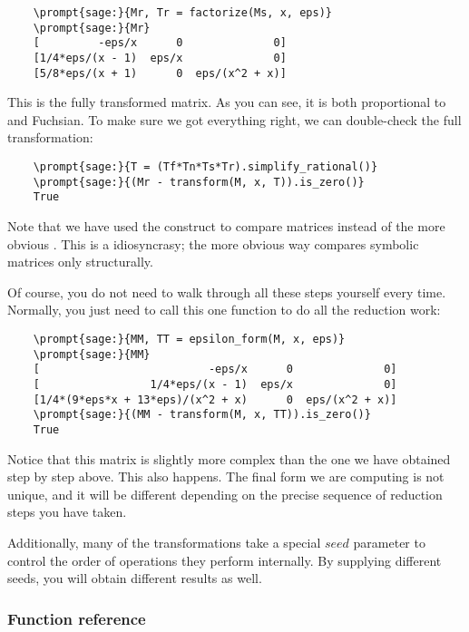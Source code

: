 \documentclass[12pt,a4paper]{article}
\begin{document}
\begin{Verbatim}
    \prompt{sage:}{Mr, Tr = factorize(Ms, x, eps)}
    \prompt{sage:}{Mr}
    [         -eps/x      0              0]
    [1/4*eps/(x - 1)  eps/x              0]
    [5/8*eps/(x + 1)      0  eps/(x^2 + x)]
\end{Verbatim}

This is the fully transformed matrix.
As you can see, it is both proportional to  and Fuchsian.
To make sure we got everything right, we can double-check the full transformation:

\begin{Verbatim}
    \prompt{sage:}{T = (Tf*Tn*Ts*Tr).simplify_rational()}
    \prompt{sage:}{(Mr - transform(M, x, T)).is_zero()}
    True
\end{Verbatim}

Note that we have used the construct  to compare matrices instead of the more obvious .
This is a \sage idiosyncrasy; the more obvious way compares symbolic matrices only structurally.

Of course, you do not need to walk through all these steps yourself every time.
Normally, you just need to call this one function to do all the reduction work:

\begin{Verbatim}
    \prompt{sage:}{MM, TT = epsilon_form(M, x, eps)}
    \prompt{sage:}{MM}
    [                          -eps/x      0              0]
    [                 1/4*eps/(x - 1)  eps/x              0]
    [1/4*(9*eps*x + 13*eps)/(x^2 + x)      0  eps/(x^2 + x)]
    \prompt{sage:}{(MM - transform(M, x, TT)).is_zero()}
    True
\end{Verbatim}

Notice that this matrix is slightly more complex than the one we have obtained step by step above.
This also happens.
The final form we are computing is not unique, and it will be different depending on the precise sequence of reduction steps you have taken.

Additionally, many of the transformations take a special $seed$ parameter to control the order of operations they perform internally.
By supplying different seeds, you will obtain different results as well.

\subsubsection{Function reference}
\end{document}
